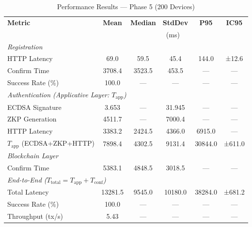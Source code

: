 %
%
\begin{table}[htbp]
\centering
\caption{Performance Results --- Phase 5 (200 Devices)}
\label{tab:phase5}
\begin{tabular}{lccccc}
\toprule
\textbf{Metric} & \textbf{Mean} & \textbf{Median} & \textbf{StdDev} & \textbf{P95} & \textbf{IC95} \\
                & \multicolumn{5}{c}{(ms)} \\
\midrule
\multicolumn{6}{l}{\textit{Registration}} \\
HTTP Latency      & 69.0 & 59.5 & 45.4 & 144.0 & ±12.6 \\
Confirm Time      & 3708.4 & 3523.5 & 453.5 & ---  & ---   \\
Success Rate (\%) & 100.0 & ---  & ---  & ---  & ---   \\
\midrule
\multicolumn{6}{l}{\textit{Authentication (Applicative Layer: $T_{\mathrm{app}}$)}} \\
ECDSA Signature   & 3.653 & ---  & 31.945 & ---  & ---   \\
ZKP Generation    & 4511.7 & ---  & 7000.4 & ---  & ---   \\
HTTP Latency      & 3383.2 & 2424.5 & 4366.0 & 6915.0 & ---   \\
$T_{\mathrm{app}}$ (ECDSA+ZKP+HTTP) & 7898.4 & 4302.5 & 9131.4 & 30844.0 & ±611.0 \\
\midrule
\multicolumn{6}{l}{\textit{Blockchain Layer}} \\
Confirm Time      & 5383.1 & 4848.5 & 3018.5 & ---  & ---   \\
\midrule
\multicolumn{6}{l}{\textit{End-to-End ($T_{\mathrm{total}} = T_{\mathrm{app}} + T_{\mathrm{conf}}$)}} \\
Total Latency     & 13281.5 & 9545.0 & 10180.0 & 38284.0 & ±681.2 \\
Success Rate (\%) & 100.0 & ---  & ---  & ---  & ---   \\
Throughput (tx/s) & 5.43 & ---  & ---  & ---  & ---   \\
\bottomrule
\end{tabular}
\end{table}
